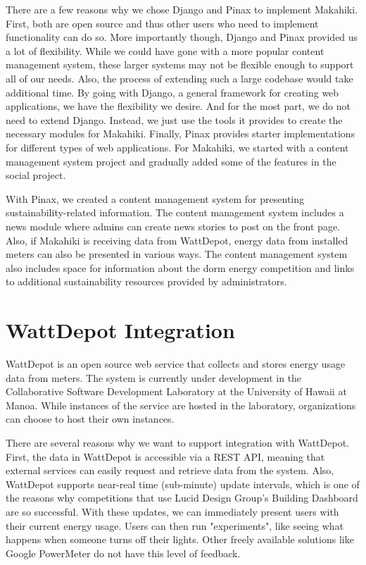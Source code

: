 There are a few reasons why we chose Django and Pinax to implement Makahiki.  First, both are open source and thus other users who need to implement functionality can do so.  More importantly though, Django and Pinax provided us a lot of flexibility.  While we could have gone with a more popular content management system, these larger systems may not be flexible enough to support all of our needs.  Also, the process of extending such a large codebase would take additional time.  By going with Django, a general framework for creating web applications, we have the flexibility we desire.  And for the most part, we do not need to extend Django.  Instead, we just use the tools it provides to create the necessary modules for Makahiki.  Finally, Pinax provides starter implementations for different types of web applications.  For Makahiki, we started with a content management system project and gradually added some of the features in the social project.

With Pinax, we created a content management system for presenting sustainability-related information.  The content management system includes a news module where admins can create news stories to post on the front page.  Also, if Makahiki is receiving data from WattDepot, energy data from installed meters can also be presented in various ways. The content management system also includes space for information about the dorm energy competition and links to additional sustainability resources provided by administrators.

\section{WattDepot Integration}
\label{wattdepot}

WattDepot is an open source web service that collects and stores energy usage data from meters.  The system is currently under development in the Collaborative Software Development Laboratory at the University of Hawaii at Manoa.  While instances of the service are hosted in the laboratory, organizations can choose to host their own instances.

There are several reasons why we want to support integration with WattDepot.  First, the data in WattDepot is accessible via a REST API\cite{wattdepot-rest}, meaning that external services can easily request and retrieve data from the system.  Also, WattDepot supports near-real time (sub-minute) update intervals, which is one of the reasons why competitions that use Lucid Design Group's Building Dashboard are so successful.  With these updates, we can immediately present users with their current energy usage.  Users can then run "experiments", like seeing what happens when someone turns off their lights.  Other freely available solutions like Google PowerMeter\cite{google-powermeter} do not have this level of feedback.


